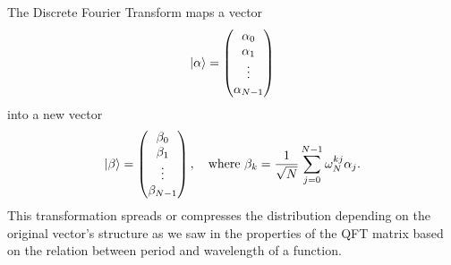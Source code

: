 \begin{remark}
The Discrete Fourier Transform maps a vector
\begin{equation}
    \ket{\alpha} = \begin{pmatrix} \alpha_0 \\ \alpha_1 \\ \vdots \\ \alpha_{N-1} \end{pmatrix}
\end{equation}
into a new vector
\begin{equation}
    \ket{\beta} = \begin{pmatrix} \beta_0 \\ \beta_1 \\ \vdots \\ \beta_{N-1} \end{pmatrix}, \quad \text{where } \beta_k = \frac{1}{\sqrt{N}} \sum_{j=0}^{N-1} \omega_N^{kj} \alpha_j.
    \label{eq:fourier_transform_formula}
\end{equation}
This transformation spreads or compresses the distribution depending on the original vector's structure as we saw in the properties of the QFT matrix based on the relation between period and wavelength of a function.
\end{remark}

